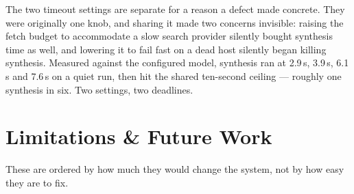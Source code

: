 \documentclass[10pt,a4paper]{article}
\begin{document}
The two timeout settings are separate for a reason a defect made concrete. They were
originally one knob, and sharing it made two concerns invisible: raising the fetch budget to
accommodate a slow search provider silently bought synthesis time as well, and lowering it to
fail fast on a dead host silently began killing synthesis. Measured against the configured model,
synthesis ran at 2.9\,s, 3.9\,s, 6.1\,s and 7.6\,s on a quiet run, then hit the shared ten-second
ceiling --- roughly one synthesis in six. Two settings, two deadlines.

\section{Limitations \& Future Work}
\label{sec:limits}

These are ordered by how much they would change the system, not by how easy they are to fix.
\end{document}
